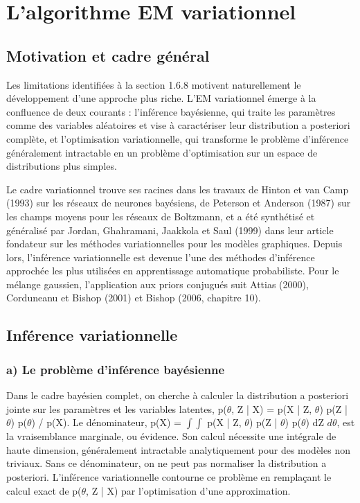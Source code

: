 \section{L'algorithme EM variationnel}
\subsection{Motivation et cadre général}
Les limitations identifiées à la section 1.6.8 motivent naturellement le développement d'une approche plus riche. L'EM variationnel émerge à la confluence de deux courants : l'inférence bayésienne, qui traite les paramètres comme des variables aléatoires et vise à caractériser leur distribution a posteriori complète, et l'optimisation variationnelle, qui transforme le problème d'inférence  généralement intractable  en un problème d'optimisation sur un espace de distributions plus simples.

Le cadre variationnel trouve ses racines dans les travaux de Hinton et van Camp (1993) sur les réseaux de neurones bayésiens, de Peterson et Anderson (1987) sur les champs moyens pour les réseaux de Boltzmann, et a été synthétisé et généralisé par Jordan, Ghahramani, Jaakkola et Saul (1999) dans leur article fondateur sur les méthodes variationnelles pour les modèles graphiques. Depuis lors, l'inférence variationnelle est devenue l'une des méthodes d'inférence approchée les plus utilisées en apprentissage automatique probabiliste. Pour le mélange gaussien, l'application aux priors conjugués suit Attias (2000), Corduneanu et Bishop (2001) et Bishop (2006, chapitre 10).

\subsection{Inférence variationnelle}
\subsubsection{a) Le problème d'inférence bayésienne}
Dans le cadre bayésien complet, on cherche à calculer la distribution a posteriori jointe sur les paramètres et les variables latentes, p($\theta $, Z | X) = p(X | Z, $\theta $) p(Z | $\theta $) p($\theta $) / p(X). Le dénominateur, p(X) = $\int \int $ p(X | Z, $\theta $) p(Z | $\theta $) p($\theta $) dZ $d\theta $, est la vraisemblance marginale, ou évidence. Son calcul nécessite une intégrale de haute dimension, généralement intractable analytiquement pour des modèles non triviaux. Sans ce dénominateur, on ne peut pas normaliser la distribution a posteriori. L'inférence variationnelle contourne ce problème en remplaçant le calcul exact de p($\theta $, Z | X) par l'optimisation d'une approximation.

